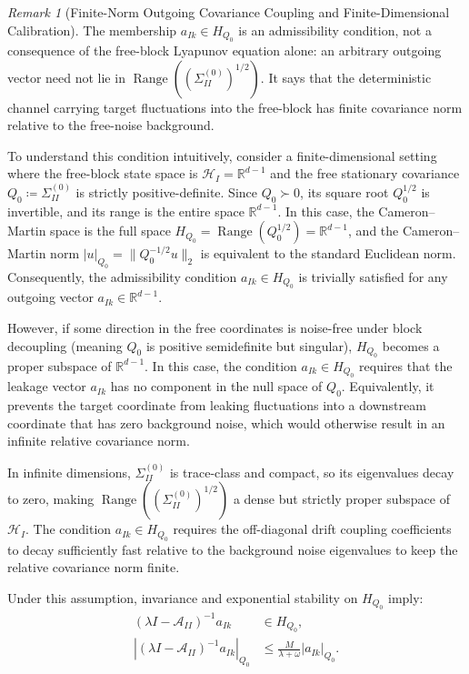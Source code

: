 \documentclass[11pt]{amsart}
\theoremstyle{plain}
\theoremstyle{definition}
\theoremstyle{remark}
\newtheorem{remark}[theorem]{Remark}
\begin{document}
\begin{remark}[Finite-Norm Outgoing Covariance Coupling and Finite-Dimensional Calibration]
  \label{rem:cm_information_flow}
  The membership $a_{Ik}\in H_{Q_0}$ is an admissibility condition,
  not a consequence of the free-block Lyapunov equation alone: an arbitrary
  outgoing vector need not lie in
  $\operatorname{Range}((\Sigma_{II}^{(0)})^{1/2})$.  It says that the
  deterministic channel carrying target fluctuations into the free-block has
  finite covariance norm relative to the free-noise background.
  
  To understand this condition intuitively, consider a finite-dimensional setting where the free-block state space is $\mathcal{H}_I = \mathbb{R}^{d-1}$ and the free stationary covariance $Q_0 \coloneqq \Sigma_{II}^{(0)}$ is strictly positive-definite. Since $Q_0 \succ 0$, its square root $Q_0^{1/2}$ is invertible, and its range is the entire space $\mathbb{R}^{d-1}$. In this case, the Cameron--Martin space is the full space $H_{Q_0} = \operatorname{Range}(Q_0^{1/2}) = \mathbb{R}^{d-1}$, and the Cameron--Martin norm $|u|_{Q_0} = \|Q_0^{-1/2} u\|_2$ is equivalent to the standard Euclidean norm. Consequently, the admissibility condition $a_{Ik} \in H_{Q_0}$ is trivially satisfied for any outgoing vector $a_{Ik} \in \mathbb{R}^{d-1}$.
  
  However, if some direction in the free coordinates is noise-free under block decoupling (meaning $Q_0$ is positive semidefinite but singular), $H_{Q_0}$ becomes a proper subspace of $\mathbb{R}^{d-1}$. In this case, the condition $a_{Ik} \in H_{Q_0}$ requires that the leakage vector $a_{Ik}$ has no component in the null space of $Q_0$. Equivalently, it prevents the target coordinate from leaking fluctuations into a downstream coordinate that has zero background noise, which would otherwise result in an infinite relative covariance norm.
  
  In infinite dimensions, $\Sigma_{II}^{(0)}$ is trace-class and compact, so its eigenvalues decay to zero, making $\operatorname{Range}((\Sigma_{II}^{(0)})^{1/2})$ a dense but strictly proper subspace of $\mathcal{H}_I$. The condition $a_{Ik} \in H_{Q_0}$ requires the off-diagonal drift coupling coefficients to decay sufficiently fast relative to the background noise eigenvalues to keep the relative covariance norm finite.
  
  Under this assumption, invariance and exponential stability on $H_{Q_0}$ imply:
  \begin{equation}
  \begin{aligned}
    (\lambda I-\mathcal{A}_{II})^{-1}a_{Ik}
       &\in H_{Q_0},\\
    |(\lambda I-\mathcal{A}_{II})^{-1}a_{Ik}|_{Q_0}
       &\le \frac{M}{\lambda+\omega}|a_{Ik}|_{Q_0}.
  \end{aligned}
  \end{equation}
\end{remark}
\end{document}
